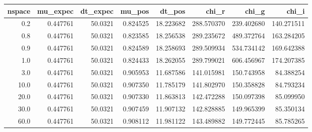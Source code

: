 \begin{tabular}{rrrrrrrr}
\toprule
 nspace &  mu\_expec &  dt\_expec &    mu\_pos &     dt\_pos &       chi\_r &       chi\_g &       chi\_i \\
\midrule
    0.2 &  0.447761 &   50.0321 &  0.824525 &  18.223682 &  288.570370 &  239.402680 &  140.271511 \\
    0.8 &  0.447761 &   50.0321 &  0.823585 &  18.256538 &  289.235672 &  489.372764 &  163.284205 \\
    0.9 &  0.447761 &   50.0321 &  0.824589 &  18.258693 &  289.509934 &  534.734142 &  169.642388 \\
    1.0 &  0.447761 &   50.0321 &  0.824433 &  18.262055 &  289.799021 &  606.456967 &  174.207385 \\
    3.0 &  0.447761 &   50.0321 &  0.905953 &  11.687586 &  141.015981 &  150.743958 &   84.388254 \\
   10.0 &  0.447761 &   50.0321 &  0.907350 &  11.785179 &  141.802970 &  150.358828 &   84.793234 \\
   20.0 &  0.447761 &   50.0321 &  0.907330 &  11.863813 &  142.472288 &  150.097398 &   85.099950 \\
   30.0 &  0.447761 &   50.0321 &  0.907459 &  11.907132 &  142.828885 &  149.965399 &   85.350134 \\
   60.0 &  0.447761 &   50.0321 &  0.908112 &  11.981122 &  143.489882 &  149.772445 &   85.785265 \\
\bottomrule
\end{tabular}
